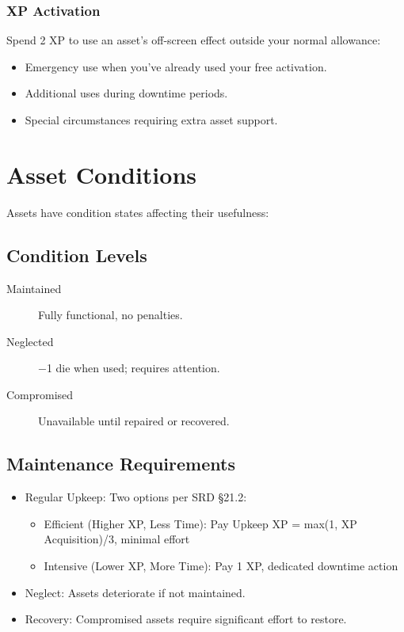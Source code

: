 \documentclass[11pt,twoside,openany]{book}
\begin{document}
\subsubsection*{XP Activation}

Spend 2 XP to use an asset's off-screen effect outside your normal allowance:
\begin{itemize}
\item Emergency use when you've already used your free activation.
\item Additional uses during downtime periods.
\item Special circumstances requiring extra asset support.
\end{itemize}

\section*{Asset Conditions} 

Assets have condition states affecting their usefulness:

\subsection*{Condition Levels}

\begin{description}
\item[Maintained] Fully functional, no penalties.
\item[Neglected] −1 die when used; requires attention.
\item[Compromised] Unavailable until repaired or recovered.
\end{description}

\subsection*{Maintenance Requirements}

\begin{itemize}
\item Regular Upkeep: Two options per SRD §21.2:
\begin{itemize}
\item Efficient (Higher XP, Less Time): Pay Upkeep XP = max(1, XP Acquisition)/3, minimal effort
\item Intensive (Lower XP, More Time): Pay 1 XP, dedicated downtime action
\end{itemize}
\item Neglect: Assets deteriorate if not maintained.
\item Recovery: Compromised assets require significant effort to restore.
\end{itemize}
\end{document}
